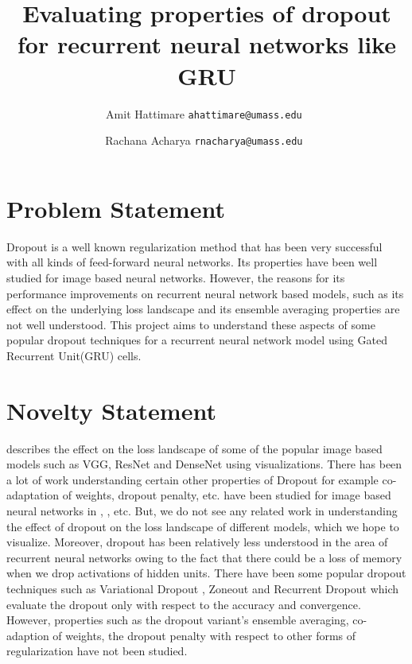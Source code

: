 \documentclass[11pt,a4paper]{article}
\title{Evaluating properties of dropout for recurrent neural networks like GRU}
\author{Amit Hattimare {\tt\small ahattimare@umass.edu }
\and
Rachana Acharya {\tt\small rnacharya@umass.edu }}
\begin{document}
\maketitle

\section{Problem Statement}
Dropout is a well known regularization method that has been very successful with all kinds of feed-forward neural networks. Its properties have been well studied for image based neural networks. However, the reasons for its performance improvements on recurrent neural network based models, such as its effect on the underlying loss landscape and its ensemble averaging properties are not well understood. This project aims to understand these aspects of some popular dropout techniques for a recurrent neural network model using Gated Recurrent Unit(GRU) cells. 

\section{Novelty Statement}
\cite{DBLP:journals/corr/abs-1712-09913} describes the effect on the loss landscape of some of the popular image based models such as VGG, ResNet and DenseNet using visualizations. There has been a lot of work understanding certain other properties of Dropout for example co-adaptation of weights, dropout penalty, etc. have been studied for image based neural networks in \cite{DBLP:journals/corr/HelmboldL16}, \cite{conf/nips/BaldiS13}, etc. But, we do not see any related work in understanding the effect of dropout on the loss landscape of different models, which we hope to visualize. Moreover, dropout has been relatively less understood in the area of recurrent neural networks owing to the fact that there could be a loss of memory when we drop activations of hidden units. There have been some popular dropout techniques such as Variational Dropout \cite{gal2016theoretically}, Zoneout \cite{krueger2017zoneout} and Recurrent Dropout \cite{semeniuta2016recurrent} which evaluate the dropout only with respect to the accuracy and convergence. However, properties such as the dropout variant's ensemble averaging, co-adaption of weights, the dropout penalty with respect to other forms of regularization have not been studied. 
\end{document}
